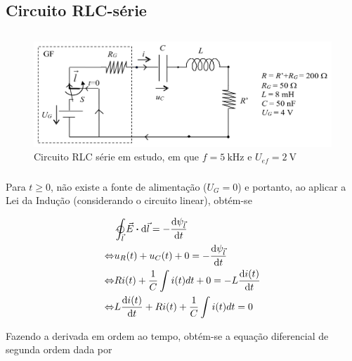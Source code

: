 \documentclass[a4paper, titlepage, portuguese]{article}
\newcommand{\eq}{\Leftrightarrow} %
\begin{document}
	\subsubsection{}

	\subsubsection{}

	\subsection{Circuito RLC-série}
	\subsection{}
		\begin{figure}[H]
			\centering
			\includegraphics[width=0.7\linewidth]{rlc.png}
			\caption{Circuito RLC série em estudo, em que $f = \SI{5}{\kilo\hertz}$ e $U_{ef} = \SI{2}{\volt}$}
			\label{fig:circ_rlc}
		\end{figure}
	\subsubsection{}

		\par
		Para $t \geq 0$, não existe a fonte de alimentação ($U_G = 0$) e portanto, ao aplicar a Lei da Indução (considerando o circuito linear), obtém-se

		\begin{align*}
			&\ointclockwise_{\vec{l}} \vec{E} \vdot \dd{\vec{l}} = - \dv{\psi_{\vec{l}}}{t} \\ \eq
			&u_R(t) + u_C(t) + 0 = - \dv{\psi_{\vec{l}}}{t} \\ \eq
			&Ri(t) + \frac{1}{C} \int i(t) dt + 0 = -L \dv{i(t)}{t} \\ \eq
			&L \dv{i(t)}{t} + Ri(t) + \frac{1}{C} \int i(t) dt = 0 \\
		\end{align*}

		Fazendo a derivada em ordem ao tempo, obtém-se a equação diferencial de segunda ordem dada por
\end{document}
